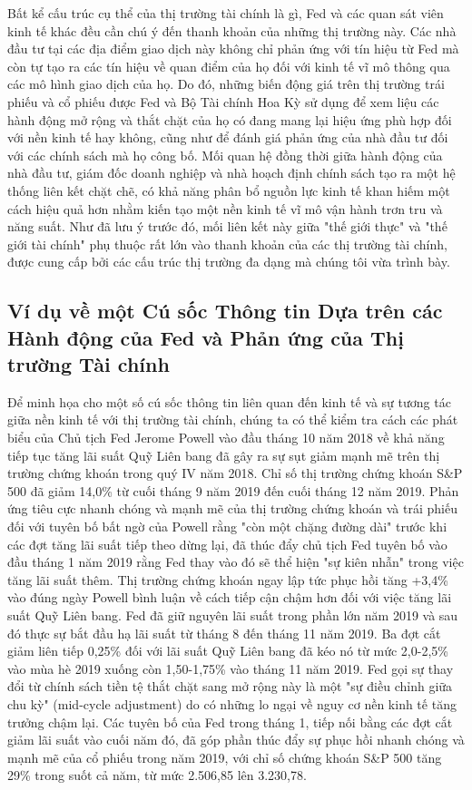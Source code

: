 Bất kể cấu trúc cụ thể của thị trường tài chính là gì, Fed và các quan sát viên kinh tế khác đều cần chú ý đến thanh khoản của những thị trường này. Các nhà đầu tư tại các địa điểm giao dịch này không chỉ phản ứng với tín hiệu từ Fed mà còn tự tạo ra các tín hiệu về quan điểm của họ đối với kinh tế vĩ mô thông qua các mô hình giao dịch của họ. Do đó, những biến động giá trên thị trường trái phiếu và cổ phiếu được Fed và Bộ Tài chính Hoa Kỳ sử dụng để xem liệu các hành động mở rộng và thắt chặt của họ có đang mang lại hiệu ứng phù hợp đối với nền kinh tế hay không, cũng như để đánh giá phản ứng của nhà đầu tư đối với các chính sách mà họ công bố. Mối quan hệ đồng thời giữa hành động của nhà đầu tư, giám đốc doanh nghiệp và nhà hoạch định chính sách tạo ra một hệ thống liên kết chặt chẽ, có khả năng phân bổ nguồn lực kinh tế khan hiếm một cách hiệu quả hơn nhằm kiến tạo một nền kinh tế vĩ mô vận hành trơn tru và năng suất. Như đã lưu ý trước đó, mối liên kết này giữa "thế giới thực" và "thế giới tài chính" phụ thuộc rất lớn vào thanh khoản của các thị trường tài chính, được cung cấp bởi các cấu trúc thị trường đa dạng mà chúng tôi vừa trình bày.

\subsection{Ví dụ về một Cú sốc Thông tin Dựa trên các Hành động của Fed và Phản ứng của Thị trường Tài chính}

Để minh họa cho một số cú sốc thông tin liên quan đến kinh tế và sự tương tác giữa nền kinh tế với thị trường tài chính, chúng ta có thể kiểm tra cách các phát biểu của Chủ tịch Fed Jerome Powell vào đầu tháng 10 năm 2018 về khả năng tiếp tục tăng lãi suất Quỹ Liên bang đã gây ra sự sụt giảm mạnh mẽ trên thị trường chứng khoán trong quý IV năm 2018. Chỉ số thị trường chứng khoán S\&P 500 đã giảm 14,0\% từ cuối tháng 9 năm 2019 đến cuối tháng 12 năm 2019. Phản ứng tiêu cực nhanh chóng và mạnh mẽ của thị trường chứng khoán và trái phiếu đối với tuyên bố bất ngờ của Powell rằng "còn một chặng đường dài" trước khi các đợt tăng lãi suất tiếp theo dừng lại, đã thúc đẩy chủ tịch Fed tuyên bố vào đầu tháng 1 năm 2019 rằng Fed thay vào đó sẽ thể hiện "sự kiên nhẫn" trong việc tăng lãi suất thêm. Thị trường chứng khoán ngay lập tức phục hồi tăng +3,4\% vào đúng ngày Powell bình luận về cách tiếp cận chậm hơn đối với việc tăng lãi suất Quỹ Liên bang. Fed đã giữ nguyên lãi suất trong phần lớn năm 2019 và sau đó thực sự bắt đầu hạ lãi suất từ tháng 8 đến tháng 11 năm 2019. Ba đợt cắt giảm liên tiếp 0,25\% đối với lãi suất Quỹ Liên bang đã kéo nó từ mức 2,0-2,5\% vào mùa hè 2019 xuống còn 1,50-1,75\% vào tháng 11 năm 2019. Fed gọi sự thay đổi từ chính sách tiền tệ thắt chặt sang mở rộng này là một "sự điều chỉnh giữa chu kỳ" (mid-cycle adjustment) do có những lo ngại về nguy cơ nền kinh tế tăng trưởng chậm lại. Các tuyên bố của Fed trong tháng 1, tiếp nối bằng các đợt cắt giảm lãi suất vào cuối năm đó, đã góp phần thúc đẩy sự phục hồi nhanh chóng và mạnh mẽ của cổ phiếu trong năm 2019, với chỉ số chứng khoán S\&P 500 tăng 29\% trong suốt cả năm, từ mức 2.506,85 lên 3.230,78.

